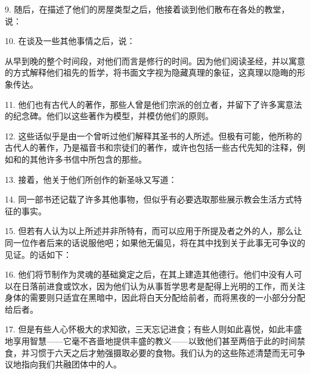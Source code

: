 9. 随后，在描述了他们的房屋类型之后，他接着谈到他们散布在各处的教堂，说：\par

10. 在谈及一些其他事情之后，说：\par

从早到晚的整个时间段，对他们而言是修行的时间。因为他们阅读圣经，并以寓意的方式解释他们祖先的哲学，将书面文字视为隐藏真理的象征，这真理以隐晦的形象传达。\par

11. 他们也有古代人的著作，那些人曾是他们宗派的创立者，并留下了许多寓意法的纪念碑。他们以这些著作为模型，并模仿他们的原则。\par

12. 这些话似乎是由一个曾听过他们解释其圣书的人所述。但极有可能，他所称的古代人的著作，乃是福音书和宗徒们的著作，或许也包括一些古代先知的注释，例如和的其他许多书信中所包含的那些。\par

13. 接着，他关于他们所创作的新圣咏又写道：\par

14. 同一部书还记载了许多其他事物，但似乎有必要选取那些展示教会生活方式特征的事实。\par

15. 但若有人认为以上所述并非所特有，而可以应用于所提及者之外的人，那么让同一位作者后来的话说服他吧；如果他无偏见，将在其中找到关于此事无可争议的见证。的话如下：\par

16. 他们将节制作为灵魂的基础奠定之后，在其上建造其他德行。他们中没有人可以在日落前进食或饮水，因为他们认为从事哲学思考是配得上光明的工作，而关注身体的需要则只适宜在黑暗中，因此将白天分配给前者，而将黑夜的一小部分分配给后者。\par

17. 但是有些人心怀极大的求知欲，三天忘记进食；有些人则如此喜悦，如此丰盛地享用智慧——它毫不吝啬地提供丰盛的教义——以致他们甚至两倍于此的时间禁食，并习惯于六天之后才勉强摄取必要的食物。我们认为的这些陈述清楚而无可争议地指向我们共融团体中的人。\par

